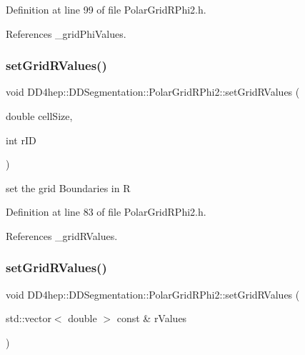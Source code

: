 Definition at line 99 of file Polar\+Grid\+R\+Phi2.\+h.



References \+\_\+grid\+Phi\+Values.

\hypertarget{class_d_d4hep_1_1_d_d_segmentation_1_1_polar_grid_r_phi2_a2194e846c26953f06cc74481d8aadeb4}{}\label{class_d_d4hep_1_1_d_d_segmentation_1_1_polar_grid_r_phi2_a2194e846c26953f06cc74481d8aadeb4} 
\subsubsection{\texorpdfstring{set\+Grid\+R\+Values()}{setGridRValues()}\hspace{0.1cm}{\footnotesize\ttfamily [1/2]}}
{\footnotesize\ttfamily void D\+D4hep\+::\+D\+D\+Segmentation\+::\+Polar\+Grid\+R\+Phi2\+::set\+Grid\+R\+Values (\begin{DoxyParamCaption}\item[{double}]{cell\+Size,  }\item[{int}]{r\+ID }\end{DoxyParamCaption})\hspace{0.3cm}{\ttfamily [inline]}}



set the grid Boundaries in R 



Definition at line 83 of file Polar\+Grid\+R\+Phi2.\+h.



References \+\_\+grid\+R\+Values.

\hypertarget{class_d_d4hep_1_1_d_d_segmentation_1_1_polar_grid_r_phi2_a6d8ed0487267fd1b67bc0d76b2f41b3a}{}\label{class_d_d4hep_1_1_d_d_segmentation_1_1_polar_grid_r_phi2_a6d8ed0487267fd1b67bc0d76b2f41b3a} 
\subsubsection{\texorpdfstring{set\+Grid\+R\+Values()}{setGridRValues()}\hspace{0.1cm}{\footnotesize\ttfamily [2/2]}}
{\footnotesize\ttfamily void D\+D4hep\+::\+D\+D\+Segmentation\+::\+Polar\+Grid\+R\+Phi2\+::set\+Grid\+R\+Values (\begin{DoxyParamCaption}\item[{std\+::vector$<$ double $>$ const \&}]{r\+Values }\end{DoxyParamCaption})\hspace{0.3cm}{\ttfamily [inline]}}


